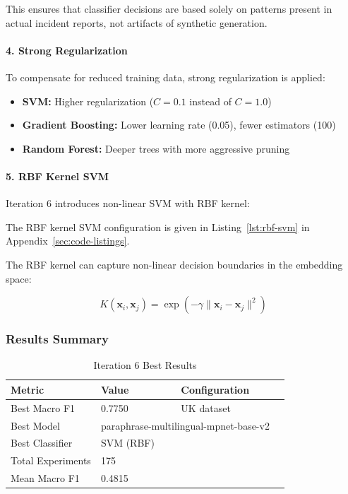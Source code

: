 \documentclass[11pt, titlepage, bibliography=totoc]{scrreprt}
\begin{document}
This ensures that classifier decisions are based solely on patterns present in actual incident reports, not artifacts of synthetic generation.

\paragraph{4. Strong Regularization}
To compensate for reduced training data, strong regularization is applied:

\begin{itemize}
    \item \textbf{SVM:} Higher regularization ($C = 0.1$ instead of $C = 1.0$)
    \item \textbf{Gradient Boosting:} Lower learning rate (0.05), fewer estimators (100)
    \item \textbf{Random Forest:} Deeper trees with more aggressive pruning
\end{itemize}

\paragraph{5. RBF Kernel SVM}
Iteration 6 introduces non-linear SVM with RBF kernel:

The RBF kernel SVM configuration is given in Listing~\ref{lst:rbf-svm} in Appendix~\ref{sec:code-listings}.

The RBF kernel can capture non-linear decision boundaries in the embedding space:

\begin{equation}
K(\mathbf{x}_i, \mathbf{x}_j) = \exp\left(-\gamma \|\mathbf{x}_i - \mathbf{x}_j\|^2\right)
\end{equation}

\subsubsection{Results Summary}

\begin{table}[htbp]
\centering
\caption{Iteration 6 Best Results}
\label{tab:iter6-results}
\begin{tabular}{@{}llll@{}}
\toprule
\textbf{Metric} & \textbf{Value} & \textbf{Configuration} \\
\midrule
Best Macro F1 & 0.7750 & UK dataset \\
Best Model & \multicolumn{2}{l}{paraphrase-multilingual-mpnet-base-v2} \\
Best Classifier & SVM (RBF) & \\
Total Experiments & 175 & \\
Mean Macro F1 & 0.4815 & \\
\bottomrule
\end{tabular}
\end{table}
\end{document}
